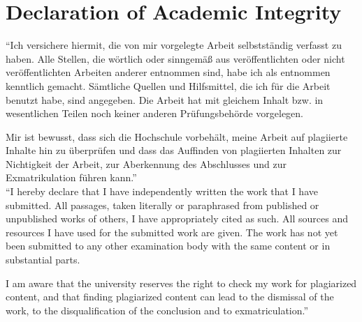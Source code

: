 \documentclass[a4paper]{book}
\def\datum{04. July 2022}
\begin{document}
\begin{titlepage}
\end{titlepage}


\clearpage
\section*{Declaration of Academic Integrity}

``Ich versichere hiermit, die von mir vorgelegte Arbeit selbstst\"{a}ndig verfasst zu haben. Alle Stellen, die w\"{o}rtlich oder sinngem\"{a}\ss{} aus ver\"{o}ffentlichten oder nicht ver\"{o}ffentlichten Arbeiten anderer entnommen sind, habe ich als entnommen kenntlich gemacht. S\"{a}mtliche Quellen und Hilfsmittel, die ich f\"{u}r die Arbeit benutzt habe, sind angegeben. Die Arbeit hat mit gleichem Inhalt bzw. in wesentlichen Teilen noch keiner anderen Pr\"{u}fungsbeh\"{o}rde vorgelegen.

Mir ist bewusst, dass sich die Hochschule vorbeh\"{a}lt, meine Arbeit auf plagiierte Inhalte hin zu \"{u}berpr\"{u}fen und dass das Auffinden von plagiierten Inhalten zur Nichtigkeit der Arbeit, zur Aberkennung des Abschlusses und zur Exmatrikulation f\"{u}hren kann.''\\

\noindent ``I hereby declare that I have independently written the work that I have submitted. All passages, taken literally or paraphrased from published or unpublished works of others, I have appropriately cited as such. All sources and resources I have used for the submitted work are given. The work has not yet been submitted to any other examination body with the same content or in substantial parts.

I am aware that the university reserves the right to check my work for plagiarized content, and that finding plagiarized content can lead to the dismissal of the work, to the disqualification of the conclusion and to exmatriculation.''
\end{document}
